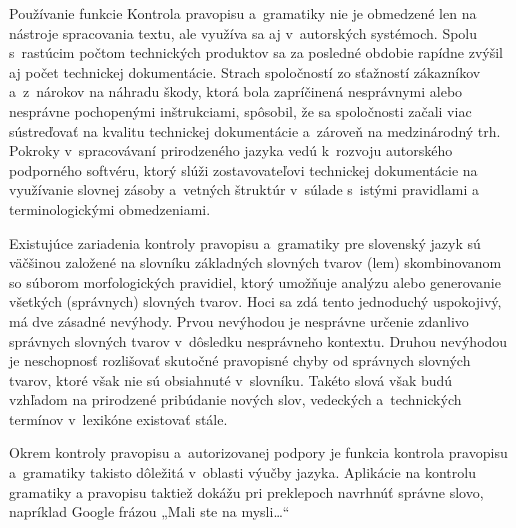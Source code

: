 \begin{multicols}{2}
Používanie funkcie Kontrola pravopisu a~gramatiky nie je obmedzené
len na nástroje spracovania textu, ale využíva sa aj
v~autorských systémoch. Spolu s~rastúcim počtom technických
produktov sa za posledné obdobie rapídne zvýšil aj počet technickej
dokumentácie. Strach spoločností zo sťažností zákazníkov
a~z~nárokov na náhradu škody, ktorá bola zapríčinená nesprávnymi
alebo nesprávne pochopenými inštrukciami, spôsobil, že sa
spoločnosti začali viac sústreďovať na kvalitu technickej
dokumentácie a~zároveň na medzinárodný trh. Pokroky
v~spracovávaní prirodzeného jazyka vedú k~rozvoju autorského
podporného softvéru, ktorý slúži zostavovateľovi technickej
dokumentácie na využívanie slovnej zásoby a~vetných štruktúr
v~súlade s~istými pravidlami a terminologickými
obmedzeniami.



Existujúce zariadenia kontroly pravopisu a~gramatiky pre slovenský
jazyk sú väčšinou založené na slovníku základných slovných
tvarov (lem) skombinovanom so súborom morfologických pravidiel, ktorý
umožňuje analýzu alebo generovanie všetkých (správnych) slovných
tvarov. Hoci sa zdá tento jednoduchý uspokojivý, má dve
zásadné nevýhody. Prvou nevýhodou je nesprávne určenie zdanlivo
správnych slovných tvarov v~dôsledku nesprávneho kontextu. Druhou
nevýhodou je neschopnosť rozlišovať skutočné pravopisné chyby od
správnych slovných tvarov, ktoré však nie sú obsiahnuté
v~slovníku. Takéto slová však budú vzhľadom na prirodzené
pribúdanie nových slov, vedeckých a~technických termínov
v~lexikóne existovať stále.

Okrem kontroly pravopisu a~autorizovanej podpory je funkcia kontrola
pravopisu a~gramatiky takisto dôležitá v~oblasti výučby jazyka. Aplikácie na kontrolu gramatiky a pravopisu taktiež dokážu pri preklepoch navrhnúť správne slovo, napríklad Google frázou „Mali ste na mysli\dots“


\end{multicols}
